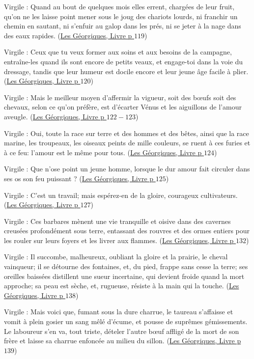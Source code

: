 \documentclass[a4paper, 11pt, hidelinks]{article}
\newcommand{\bs}{\bigskip}
\newcommand{\rb}[1]{\Romanbar{#1}}
\newcommand{\citer}[3]{\bs \begin{center} \textcolor{authorGray}{#1 :} \textcolor{citationRed}{\og #2 \fg} \textcolor{authorGray}{(\underline{#3})} \end{center} \bs}
\begin{document}
\citer{Virgile}{Quand au bout de quelques mois elles errent, chargées de leur fruit, qu'on ne les laisse point mener sous le joug des 
chariots lourds, ni franchir un chemin en sautant, ni s'enfuir au galop dans les prés, ni se jeter à la nage dans des eaux rapides.}{Les Géorgiques, Livre \rb{3} p $119$}


\citer{Virgile}{Ceux que tu veux former aux soins et aux besoins de la campagne, entraîne-les quand ils sont encore de petits veaux,
et engage-toi dans la voie du dressage, tandis que leur humeur est docile encore et leur jeune âge facile à plier.}{Les Géorgiques, Livre \rb{3} p $120$}


\citer{Virgile}{Mais le meilleur moyen d'affermir la vigueur, soit des b\oe ufs soit des chevaux, selon ce qu'on préfère, est d'écarter 
Vénus et les aiguillons de l'amour aveugle.}{Les Géorgiques, Livre \rb{3} p $122-123$}


\citer{Virgile}{Oui, toute la race sur terre et des hommes et des bêtes, ainsi que la race marine, les troupeaux, 
les oiseaux peints de mille couleurs, se ruent à ces furies et à ce feu: l'amour est le même pour tous.}{Les Géorgiques, Livre \rb{3} p $124$}


\citer{Virgile}{Que n'ose point un jeune homme, lorsque le dur amour fait circuler dans ses os son feu puissant ?}{Les Géorgiques, Livre \rb{3} p $125$}


\citer{Virgile}{C'est un travail; mais espérez-en de la gloire, courageux cultivateurs.}{Les Géorgiques, Livre \rb{3} p $127$}


\citer{Virgile}{Ces barbares mènent une vie tranquille et oisive dans des cavernes creusées profondément sous terre, entassant 
des rouvres et des ormes entiers pour les rouler sur leurs foyers et les livrer aux flammes.}{Les Géorgiques, Livre \rb{3} p $132$}


\citer{Virgile}{Il succombe, malheureux, oubliant la gloire et la prairie, le cheval vainqueur; il se détourne des fontaines, et,
du pied, frappe sans cesse la terre; ses oreilles baissées distillent une sueur incertaine, qui devient froide quand la mort
approche; sa peau est sèche, et, rugueuse, résiste à la main qui la touche.}{Les Géorgiques, Livre \rb{3} p $138$}


\citer{Virgile}{Mais voici que, fumant sous la dure charrue, le taureau s'affaisse et vomit à plein gosier un sang mêlé d'écume, et 
pousse de suprêmes gémissements. Le laboureur s'en va, tout triste, dételer l'autre b\oe uf affligé de la mort de son frère et laisse 
sa charrue enfoncée au milieu du sillon.}{Les Géorgiques, Livre \rb{3} p $139$}
\end{document}
